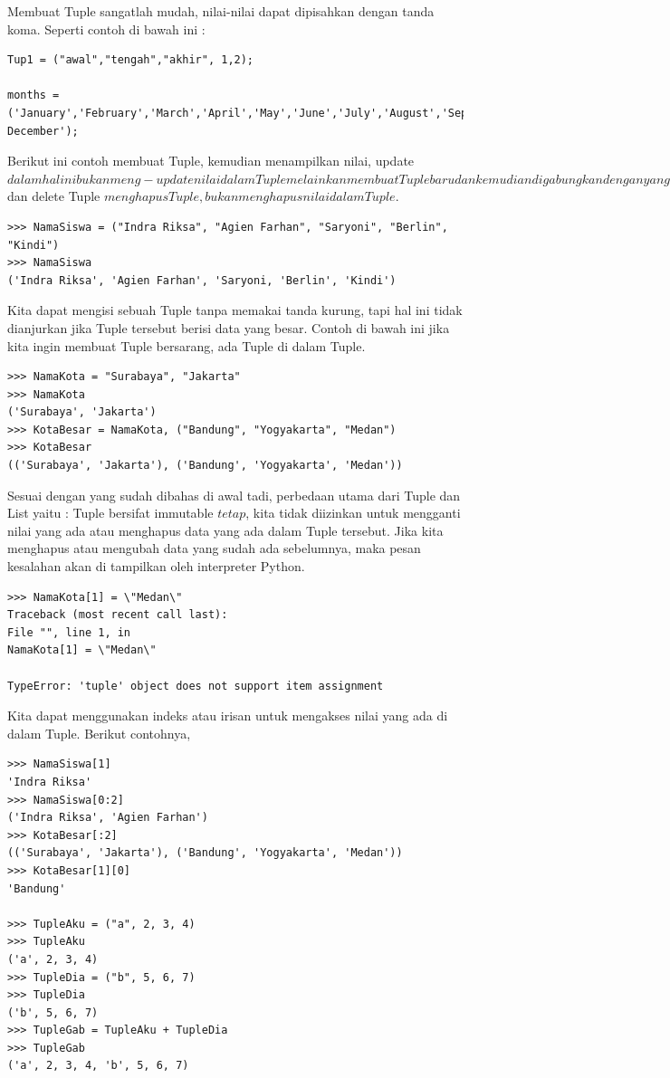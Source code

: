 Membuat Tuple sangatlah mudah, nilai-nilai dapat dipisahkan dengan tanda koma. Seperti contoh di bawah ini : 
\begin{verbatim}
Tup1 = ("awal","tengah","akhir", 1,2); 

months = ('January','February','March','April','May','June','July','August','September','October','November',' December'); 
 \end{verbatim}
Berikut ini contoh membuat Tuple, kemudian menampilkan nilai, update \(dalam hal ini bukan meng-update nilai dalam Tuple melainkan membuat Tuple baru dan kemudian digabungkan dengan yang lama\) dan delete Tuple \(menghapus Tuple, bukan menghapus nilai dalam Tuple\). 
\begin{verbatim}
>>> NamaSiswa = ("Indra Riksa", "Agien Farhan", "Saryoni", "Berlin", "Kindi") 
>>> NamaSiswa 
('Indra Riksa', 'Agien Farhan', 'Saryoni, 'Berlin', 'Kindi') 
\end{verbatim}
Kita dapat mengisi sebuah Tuple tanpa memakai tanda kurung, tapi hal ini tidak dianjurkan jika Tuple tersebut berisi data yang besar. Contoh di bawah ini jika kita ingin membuat Tuple bersarang, ada Tuple di dalam Tuple. 
\begin{verbatim}
>>> NamaKota = "Surabaya", "Jakarta" 
>>> NamaKota 
('Surabaya', 'Jakarta') 
>>> KotaBesar = NamaKota, ("Bandung", "Yogyakarta", "Medan") 
>>> KotaBesar 
(('Surabaya', 'Jakarta'), ('Bandung', 'Yogyakarta', 'Medan'))
\end{verbatim}
Sesuai dengan yang sudah dibahas di awal tadi, perbedaan utama dari Tuple dan List yaitu : 
Tuple bersifat immutable \(tetap\), kita tidak diizinkan untuk mengganti nilai yang ada atau menghapus data yang ada dalam Tuple tersebut. Jika kita menghapus atau mengubah data yang sudah ada sebelumnya, maka pesan kesalahan akan di tampilkan oleh interpreter Python. 
\begin{verbatim}
>>> NamaKota[1] = \"Medan\" 
Traceback (most recent call last): 
File "", line 1, in 
NamaKota[1] = \"Medan\" 

TypeError: 'tuple' object does not support item assignment 
\end{verbatim}
Kita dapat menggunakan indeks atau irisan untuk mengakses nilai yang ada di dalam Tuple. Berikut contohnya, 
\begin{verbatim}
>>> NamaSiswa[1] 
'Indra Riksa' 
>>> NamaSiswa[0:2] 
('Indra Riksa', 'Agien Farhan') 
>>> KotaBesar[:2] 
(('Surabaya', 'Jakarta'), ('Bandung', 'Yogyakarta', 'Medan')) 
>>> KotaBesar[1][0] 
'Bandung' 

>>> TupleAku = ("a", 2, 3, 4) 
>>> TupleAku 
('a', 2, 3, 4) 
>>> TupleDia = ("b", 5, 6, 7) 
>>> TupleDia 
('b', 5, 6, 7) 
>>> TupleGab = TupleAku + TupleDia 
>>> TupleGab 
('a', 2, 3, 4, 'b', 5, 6, 7) 
\end{verbatim}
